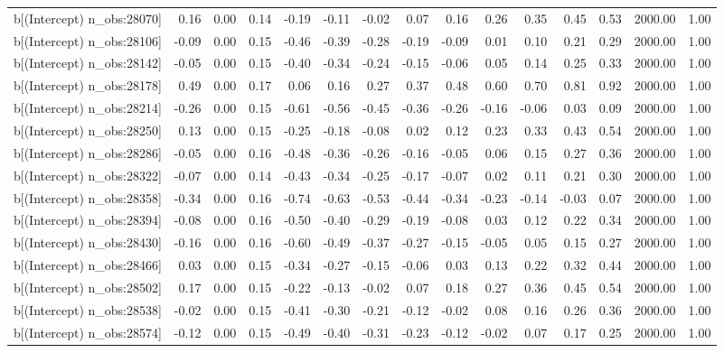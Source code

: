 \begin{table}[ht]
\begin{tabular}{rrrrrrrrrrrrrrr}
  b[(Intercept) n\_obs:28070] & 0.16 & 0.00 & 0.14 & -0.19 & -0.11 & -0.02 & 0.07 & 0.16 & 0.26 & 0.35 & 0.45 & 0.53 & 2000.00 & 1.00 \\ 
  b[(Intercept) n\_obs:28106] & -0.09 & 0.00 & 0.15 & -0.46 & -0.39 & -0.28 & -0.19 & -0.09 & 0.01 & 0.10 & 0.21 & 0.29 & 2000.00 & 1.00 \\ 
  b[(Intercept) n\_obs:28142] & -0.05 & 0.00 & 0.15 & -0.40 & -0.34 & -0.24 & -0.15 & -0.06 & 0.05 & 0.14 & 0.25 & 0.33 & 2000.00 & 1.00 \\ 
  b[(Intercept) n\_obs:28178] & 0.49 & 0.00 & 0.17 & 0.06 & 0.16 & 0.27 & 0.37 & 0.48 & 0.60 & 0.70 & 0.81 & 0.92 & 2000.00 & 1.00 \\ 
  b[(Intercept) n\_obs:28214] & -0.26 & 0.00 & 0.15 & -0.61 & -0.56 & -0.45 & -0.36 & -0.26 & -0.16 & -0.06 & 0.03 & 0.09 & 2000.00 & 1.00 \\ 
  b[(Intercept) n\_obs:28250] & 0.13 & 0.00 & 0.15 & -0.25 & -0.18 & -0.08 & 0.02 & 0.12 & 0.23 & 0.33 & 0.43 & 0.54 & 2000.00 & 1.00 \\ 
  b[(Intercept) n\_obs:28286] & -0.05 & 0.00 & 0.16 & -0.48 & -0.36 & -0.26 & -0.16 & -0.05 & 0.06 & 0.15 & 0.27 & 0.36 & 2000.00 & 1.00 \\ 
  b[(Intercept) n\_obs:28322] & -0.07 & 0.00 & 0.14 & -0.43 & -0.34 & -0.25 & -0.17 & -0.07 & 0.02 & 0.11 & 0.21 & 0.30 & 2000.00 & 1.00 \\ 
  b[(Intercept) n\_obs:28358] & -0.34 & 0.00 & 0.16 & -0.74 & -0.63 & -0.53 & -0.44 & -0.34 & -0.23 & -0.14 & -0.03 & 0.07 & 2000.00 & 1.00 \\ 
  b[(Intercept) n\_obs:28394] & -0.08 & 0.00 & 0.16 & -0.50 & -0.40 & -0.29 & -0.19 & -0.08 & 0.03 & 0.12 & 0.22 & 0.34 & 2000.00 & 1.00 \\ 
  b[(Intercept) n\_obs:28430] & -0.16 & 0.00 & 0.16 & -0.60 & -0.49 & -0.37 & -0.27 & -0.15 & -0.05 & 0.05 & 0.15 & 0.27 & 2000.00 & 1.00 \\ 
  b[(Intercept) n\_obs:28466] & 0.03 & 0.00 & 0.15 & -0.34 & -0.27 & -0.15 & -0.06 & 0.03 & 0.13 & 0.22 & 0.32 & 0.44 & 2000.00 & 1.00 \\ 
  b[(Intercept) n\_obs:28502] & 0.17 & 0.00 & 0.15 & -0.22 & -0.13 & -0.02 & 0.07 & 0.18 & 0.27 & 0.36 & 0.45 & 0.54 & 2000.00 & 1.00 \\ 
  b[(Intercept) n\_obs:28538] & -0.02 & 0.00 & 0.15 & -0.41 & -0.30 & -0.21 & -0.12 & -0.02 & 0.08 & 0.16 & 0.26 & 0.36 & 2000.00 & 1.00 \\ 
  b[(Intercept) n\_obs:28574] & -0.12 & 0.00 & 0.15 & -0.49 & -0.40 & -0.31 & -0.23 & -0.12 & -0.02 & 0.07 & 0.17 & 0.25 & 2000.00 & 1.00 \\ 

\end{tabular}
\end{table}
